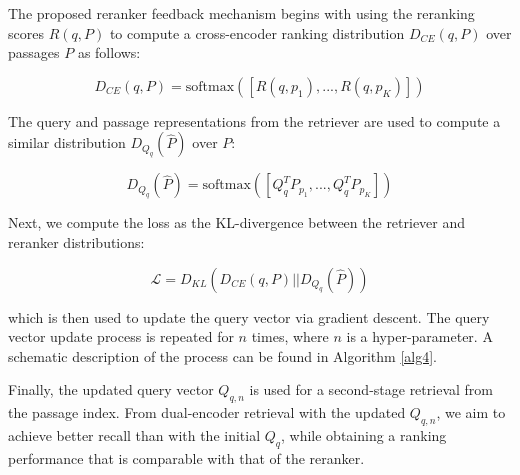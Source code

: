 The proposed reranker feedback mechanism begins with using the reranking scores $R(q,P)$ to compute a cross-encoder ranking distribution $D_{CE}(q,P)$ over passages $P$ as follows:

\begin{equation}
D_{CE}(q,P)=\mathrm{softmax}([R(q,p_1), ..., R(q,p_K)])
\label{eq:d-ce}
\end{equation} 

The query and passage representations from the retriever are used to compute a similar distribution $D_{Q_q}(\hat{P})$ over $P$:

\begin{equation}
    D_{Q_q}(\hat{P}) = \mathrm{softmax}([Q_q^TP_{p_1}, ..., Q_q^TP_{p_K}])
    \label{eq:d-q}
\end{equation}

Next, we compute the loss as the KL-divergence between the retriever and reranker distributions:

\begin{equation}
    \mathcal{L} = D_{KL}(D_{CE}(q,P) || D_{Q_q}(\hat{P}))
    \label{eq:loss}
\end{equation}

which is then used to update the query vector via gradient descent. The query vector update process is repeated for $n$ times, where $n$ is a hyper-parameter. 
A schematic description of the process can be found in Algorithm \ref{alg4}. 

Finally, the updated query vector $Q_{q,n}$ is used for a second-stage retrieval from the passage index.  
From dual-encoder retrieval with the updated $Q_{q,n}$, we aim to achieve better recall than with the initial $Q_q$, while obtaining a ranking performance that is comparable with that of the reranker.






